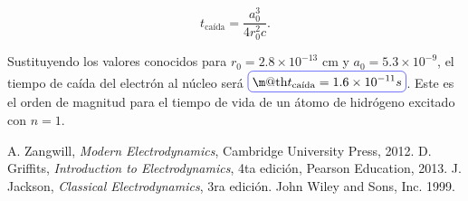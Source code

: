 \documentclass[a4paper,11pt]{article}
\makeatletter
\numberwithin{equation}{section}
\newcommand*{\boxcolor}{blue}
\renewcommand{\boxed}[1]{\textcolor{\boxcolor}{%
\tikz[baseline={([yshift=-1ex]current bounding box.center)}] \node [rectangle, minimum width=1ex,rounded corners,draw] {\normalcolor\m@th$\displaystyle#1$};}}
\makeatother
\begin{document}
\begin{equation}
 t_{\text{caída}} = \frac{a_0^3}{4r_0^2c}.
\end{equation}

Sustituyendo los valores conocidos para $r_0 = 2.8 \times 10^{-13}$ cm y 
$a_0 = 5.3 \times 10^{-9}$, el tiempo de caída del electrón al núcleo será 
$\boxed{t_{\text{caída}} = 1.6 \times 10^{-11} s}$. Este es el orden de magnitud para el tiempo de 
vida de un átomo de hidrógeno excitado con $n=1$.

\begin{thebibliography}{10}
 A. Zangwill, \emph{Modern Electrodynamics}, Cambridge University Press, 2012.
 D. Griffits, \emph{Introduction to Electrodynamics}, 4ta edición, Pearson Education, 
 2013.
J. Jackson, \emph{Classical Electrodynamics}, 3ra edición. John Wiley and Sons, Inc. 
1999.
\end{thebibliography}
\end{document}
